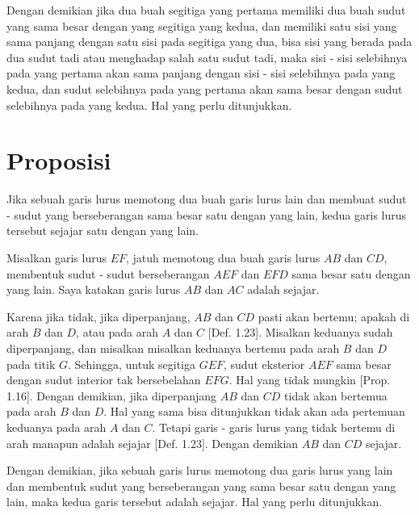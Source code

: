 \documentclass[a4paper]{book}
\begin{document}
Dengan demikian jika dua buah segitiga yang pertama memiliki dua buah sudut yang sama besar
dengan yang segitiga yang kedua, dan memiliki satu sisi yang sama panjang dengan
satu sisi pada segitiga yang dua, bisa sisi yang berada pada dua sudut tadi atau
menghadap salah satu sudut tadi, maka sisi - sisi selebihnya pada yang 
pertama akan sama panjang dengan sisi - sisi selebihnya pada yang kedua, dan 
sudut selebihnya pada yang pertama akan sama besar dengan sudut selebihnya pada
yang kedua. Hal yang perlu ditunjukkan.  

\section*{\centering Proposisi \thesection}
Jika sebuah garis lurus memotong dua buah garis lurus lain dan membuat sudut - 
sudut yang berseberangan sama besar  satu dengan yang lain, kedua garis lurus 
tersebut sejajar satu dengan yang lain.
\begin{center}
\end{center} 
Misalkan garis lurus $EF$, jatuh memotong dua buah garis lurus $AB$ dan $CD$, 
membentuk sudut - sudut berseberangan $AEF$ dan $EFD$ sama besar satu dengan 
yang lain. Saya katakan garis lurus $AB$ dan $AC$ adalah sejajar.

Karena jika tidak, jika diperpanjang, $AB$ dan $CD$ pasti akan bertemu; apakah
di arah $B$ dan $D$, atau pada arah $A$ dan $C$ [Def. 1.23]. Misalkan keduanya
sudah diperpanjang, dan misalkan misalkan keduanya bertemu pada arah 
$B$ dan $D$ pada titik $G$. Sehingga, untuk segitiga $GEF$, sudut eksterior
$AEF$ sama besar dengan sudut interior tak bersebelahan $EFG$. Hal yang tidak
mungkin [Prop. 1.16]. Dengan demikian, jika diperpanjang $AB$ dan $CD$ tidak
akan bertemua pada arah $B$ dan $D$. Hal yang sama bisa ditunjukkan tidak 
akan ada pertemuan keduanya pada arah $A$ dan $C$. Tetapi garis - garis lurus
yang tidak bertemu di arah manapun adalah sejajar [Def. 1.23]. Dengan 
demikian $AB$ dan $CD$ sejajar.

Dengan demikian, jika sebuah garis lurus memotong dua garis lurus yang lain dan
membentuk sudut yang berseberangan yang sama besar satu dengan yang lain, maka
kedua garis tersebut adalah sejajar. Hal yang perlu ditunjukkan.
\end{document}
